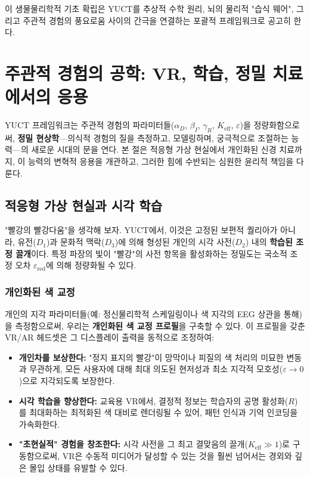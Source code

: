 \documentclass[12pt,a4paper]{article}
\begin{document}
	이 생물물리학적 기초 확립은 YUCT를 추상적 수학 원리, 뇌의 물리적 "습식 웨어", 그리고 주관적 경험의 풍요로움 사이의 간극을 연결하는 포괄적 프레임워크로 공고히 한다.
	
	\section{주관적 경험의 공학: VR, 학습, 정밀 치료에서의 응용}
	
	YUCT 프레임워크는 주관적 경험의 파라미터들(\(\alpha_D\), \(\beta_I\), \(\gamma_R\), \(K_{\mathrm{eff}}\), \(\varepsilon\))을 정량화함으로써, \textbf{정밀 현상학}—의식적 경험의 질을 측정하고, 모델링하며, 궁극적으로 조절하는 능력—의 새로운 시대의 문을 연다. 본 절은 적응형 가상 현실에서 개인화된 신경 치료까지, 이 능력의 변혁적 응용을 개관하고, 그러한 힘에 수반되는 심원한 윤리적 책임을 다룬다.
	
	\subsection{적응형 가상 현실과 시각 학습}
	
	"빨강의 빨강다움"을 생각해 보자. YUCT에서, 이것은 고정된 보편적 퀄리아가 아니라, 유전(\(D_1\))과 문화적 맥락(\(D_3\))에 의해 형성된 개인의 시각 사전(\(D_2\)) 내의 \textbf{학습된 조정 끌개}이다. 특정 파장의 빛이 "빨강"의 사전 항목을 활성화하는 정밀도는 국소적 조정 오차 \(\varepsilon_{\text{red}}\)에 의해 정량화될 수 있다.
	
	\subsubsection{개인화된 색 교정}
	개인의 지각 파라미터들(예: 정신물리학적 스케일링이나 색 지각의 EEG 상관을 통해)을 측정함으로써, 우리는 \textbf{개인화된 색 교정 프로필}을 구축할 수 있다. 이 프로필을 갖춘 VR/AR 헤드셋은 그 디스플레이 출력을 동적으로 조정하여:
	\begin{itemize}
		\item \textbf{개인차를 보상한다:} "정지 표지의 빨강"이 망막이나 피질의 색 처리의 미묘한 변동과 무관하게, 모든 사용자에 대해 최대 의도된 현저성과 최소 지각적 모호성(\(\varepsilon \to 0\))으로 지각되도록 보장한다.
		\item \textbf{시각 학습을 향상한다:} 교육용 VR에서, 결정적 정보는 학습자의 공명 활성화(\(R\))를 최대화하는 최적화된 색 대비로 렌더링될 수 있어, 패턴 인식과 기억 인코딩을 가속화한다.
		\item \textbf{"초현실적" 경험을 창조한다:} 시각 사전을 그 최고 결맞음의 끌개(\(K_{\mathrm{eff}} \gg 1\))로 구동함으로써, VR은 수동적 미디어가 달성할 수 있는 것을 훨씬 넘어서는 경외와 깊은 몰입 상태를 유발할 수 있다.
	\end{itemize}
	
\end{document}
